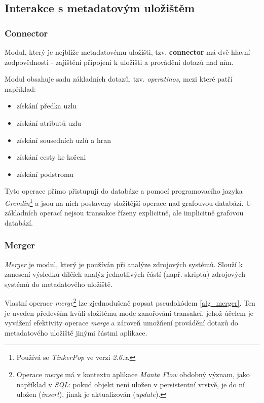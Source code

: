 
\subsection{Interakce s metadatovým uložištěm}
\label{sec:ana_interactions}

\subsubsection{Connector}
Modul, který je nejblíže metadatovému uložišti, tzv. \textbf{connector} má dvě hlavní zodpovědnosti - zajištění připojení k uložišti a provádění dotazů nad ním. 

Modul obsahuje sadu základních dotazů, tzv. \textit{operatinos}, mezi které patří například: 
\begin{itemize}
	\item{získání předka uzlu}
	\item{získání atributů uzlu}
	\item{získání sousedních uzlů a hran}
	\item{získání cesty ke kořeni}
	\item{získání podstromu}
\end{itemize} 
Tyto operace přímo přistupují do databáze a pomocí programovacího jazyka \textit{Gremlin}\footnote{Používá se \textit{TinkerPop} ve verzi \textit{2.6.x}.} a jsou na nich postaveny složitější operace nad grafouvou databází. U základních operací nejsou transakce řízeny explicitně, ale implicitně grafovou databází. 





\subsubsection{Merger}
\textit{Merger} je modul, který je používán při analýze zdrojových systémů. Slouží k zanesení výsledků dílčích analýz jednotlivých částí (např. skriptů) zdrojových systémů do metadatového uložiště. 


Vlastní operace \textit{merge}\footnote{Operace \textit{merge} má v kontextu aplikace \textit{Manta Flow} obdobný význam, jako například v \textit{SQL}: pokud objekt není uložen v persistentní vrstvě, je do ní uložen (\textit{insert}), jinak je aktualizován (\textit{update}).} lze zjednodušeně popsat pseudokódem \ref{alg_merger}. Ten je uveden především kvůli složitému mode zanořování transakcí, jehož účelem je vyvážení efektivity operace \textit{merge} a zároveň umožňení provádění dotazů do metadatového uložiště jinými částmi aplikace. %

